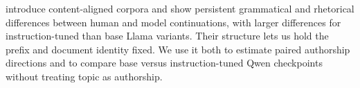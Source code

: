  \citet{reinhart2025llms} introduce content-aligned corpora and show persistent grammatical and rhetorical differences between human and model continuations, with larger differences for instruction-tuned than base Llama variants. Their \hape structure lets us hold the prefix and document identity fixed. We use it both to estimate paired authorship directions and to compare base versus instruction-tuned Qwen checkpoints without treating topic as authorship.
